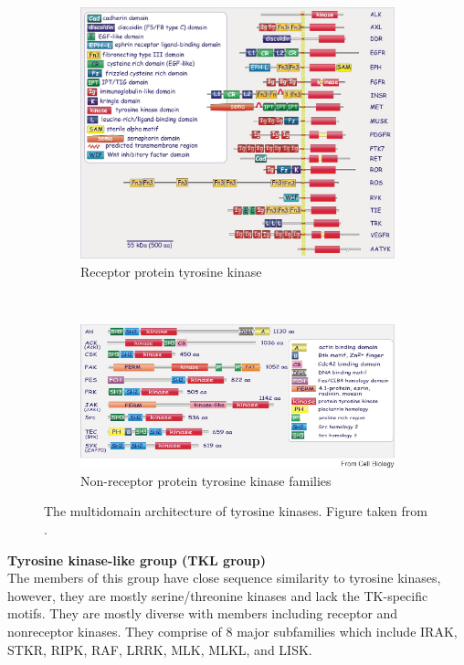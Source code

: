 \documentclass[a4paper, 11pt]{article}
\begin{document}
\begin{figure}[H]
\centering
	\begin{subfigure}{\textwidth}
	  \centering
	  \includegraphics[width=\linewidth]{figures/rtk.jpg}
	  \caption{Receptor protein tyrosine kinase}
	  \label{rtk}
	\end{subfigure}\\
	\begin{subfigure}{\textwidth}
	  \centering
	  \includegraphics[width=\linewidth]{figures/nrtk.jpg}
	  \caption{Non-receptor protein tyrosine kinase families}
	  \label{nrtk}
	\end{subfigure}
\caption{The multidomain architecture of tyrosine kinases. Figure taken from \cite{foreman2010textbook}. }
\label{tyrosine_kinase}
\end{figure}

\textbf{Tyrosine kinase-like group (TKL group)}\\
The members of this group have close sequence similarity to tyrosine kinases, however, they are mostly serine/threonine kinases and lack the TK-specific motifs. They are mostly diverse with members including receptor and nonreceptor kinases. They comprise of 8 major subfamilies which include IRAK, STKR, RIPK, RAF, LRRK, MLK, MLKL, and LISK.\\
\end{document}
